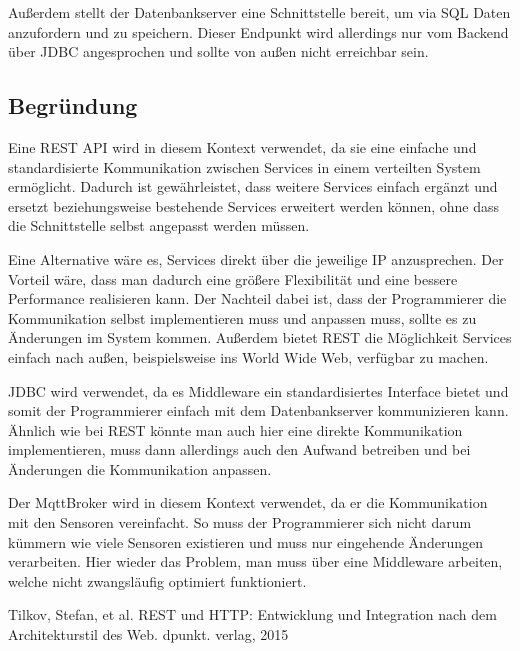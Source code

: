 \documentclass[runningheads]{llncs}
\begin{document}
Außerdem stellt der Datenbankserver eine Schnittstelle bereit, um via SQL Daten anzufordern und zu speichern.
Dieser Endpunkt wird allerdings nur vom Backend über JDBC angesprochen und sollte von außen nicht erreichbar sein.

\subsection{Begründung}
Eine  REST API wird in diesem Kontext verwendet, da sie eine einfache und standardisierte Kommunikation zwischen Services in einem verteilten System ermöglicht.
Dadurch ist gewährleistet, dass weitere Services einfach ergänzt und ersetzt beziehungsweise bestehende Services erweitert werden können, ohne dass die Schnittstelle selbst angepasst werden müssen.

Eine Alternative wäre es, Services direkt über die jeweilige IP anzusprechen.
Der Vorteil wäre, dass man dadurch eine größere Flexibilität und eine bessere Performance realisieren kann.
Der Nachteil dabei ist, dass der Programmierer die Kommunikation selbst implementieren muss und anpassen muss, sollte es zu Änderungen im System kommen.
Außerdem bietet REST die Möglichkeit Services einfach nach außen, beispielsweise ins World Wide Web, verfügbar zu machen.

JDBC wird verwendet, da es Middleware ein standardisiertes Interface bietet und somit der Programmierer einfach mit dem Datenbankserver kommunizieren kann.
Ähnlich wie bei REST könnte man auch hier eine direkte Kommunikation implementieren, muss dann allerdings auch den Aufwand betreiben und bei Änderungen die Kommunikation anpassen.

Der MqttBroker wird in diesem Kontext verwendet, da er die Kommunikation mit den Sensoren vereinfacht.
So muss der Programmierer sich nicht darum kümmern wie viele Sensoren existieren und muss nur eingehende Änderungen verarbeiten.
Hier wieder das Problem, man muss über eine Middleware arbeiten, welche nicht zwangsläufig optimiert funktioniert.


\newpage

Tilkov, Stefan, et al. REST und HTTP: Entwicklung und 
Integration nach dem Architekturstil des Web. dpunkt. verlag, 
2015

\end{document}
